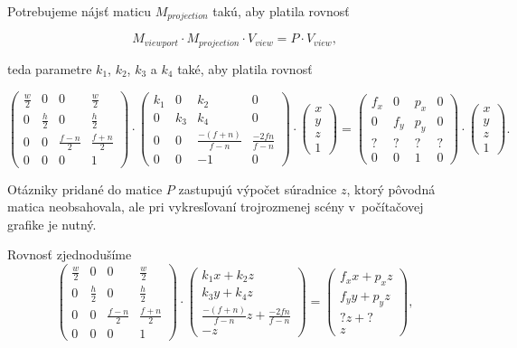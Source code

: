Potrebujeme nájsť maticu $M_{projection}$ takú, aby platila rovnosť

$$M_{viewport} \cdot M_{projection} \cdot V_{view} = P \cdot V_{view} \mathrm{,}$$

teda parametre $k_1$, $k_2$, $k_3$ a $k_4$ také, aby platila rovnosť

$$
\begin{pmatrix}
\frac{w}{2} & 0 & 0 & \frac{w}{2} \\
0 & \frac{h}{2} & 0 & \frac{h}{2} \\
0 & 0 & \frac{f-n}{2} & \frac{f+n}{2} \\
0 & 0 & 0 & 1
\end{pmatrix}
\cdot
\begin{pmatrix}
k_1 & 0 & k_2 & 0 \\
0 & k_3 & k_4 & 0 \\
0 & 0 & \frac{-(f+n)}{f-n} & \frac{-2fn}{f-n} \\
0 & 0 & -1 & 0
\end{pmatrix}
\cdot
\begin{pmatrix}
x \\
y \\
z \\
1
\end{pmatrix}
=
\begin{pmatrix}
f_x & 0 & p_x & 0 \\
0 & f_y & p_y & 0 \\
? & ? & ? & ? \\
0 & 0 &  1  & 0
\end{pmatrix}
\cdot
\begin{pmatrix}
x \\
y \\
z \\
1
\end{pmatrix} \mathrm{.}
$$

Otázniky pridané do matice $P$ zastupujú výpočet súradnice $z$, ktorý pôvodná matica neobsahovala, ale pri vykresľovaní trojrozmenej scény v~počítačovej grafike je nutný.

Rovnosť zjednodušíme
$$
\begin{pmatrix}
\frac{w}{2} & 0 & 0 & \frac{w}{2} \\
0 & \frac{h}{2} & 0 & \frac{h}{2} \\
0 & 0 & \frac{f-n}{2} & \frac{f+n}{2} \\
0 & 0 & 0 & 1
\end{pmatrix}
\cdot
\begin{pmatrix}
k_1 x + k_2 z \\
k_3 y + k_4 z \\
\frac{-(f+n)}{f-n} z + \frac{-2fn}{f-n} \\
-z
\end{pmatrix}
=
\begin{pmatrix}
f_x x + p_x z \\
f_y y + p_y z \\
? z + ? \\
z
\end{pmatrix} \mathrm{,}
$$

